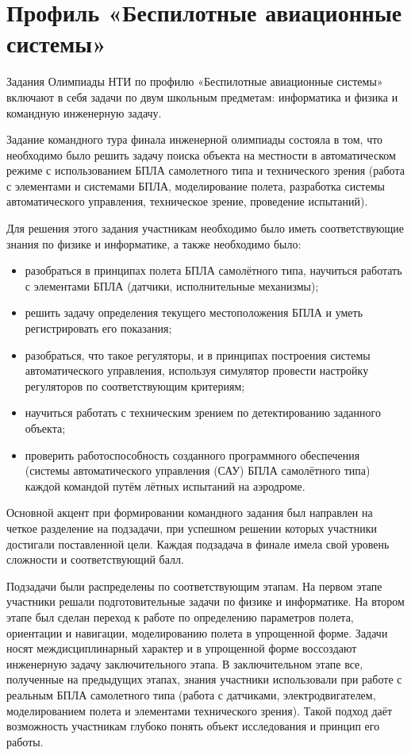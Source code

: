 

\chapter{Профиль «Беспилотные авиационные системы»}

Задания Олимпиады НТИ по профилю «Беспилотные авиационные системы» включают в себя задачи по двум школьным предметам: информатика и физика и командную инженерную задачу.

Задание командного тура финала инженерной олимпиады состояла в том, что необходимо было решить задачу поиска объекта на местности в автоматическом режиме с использованием БПЛА самолетного типа и технического зрения (работа с элементами и системами БПЛА, моделирование полета, разработка системы автоматического управления, техническое зрение, проведение испытаний).

Для решения этого задания участникам необходимо было иметь соответствующие знания по физике и информатике, а также необходимо было:
\begin{itemize}
    \item разобраться в принципах полета БПЛА самолётного типа, научиться работать с элементами БПЛА (датчики, исполнительные механизмы);
    \item решить задачу определения текущего местоположения БПЛА и уметь регистрировать его показания;
    \item разобраться, что такое регуляторы, и в принципах построения системы автоматического управления, используя симулятор провести настройку регуляторов по соответствующим критериям;
    \item научиться работать с техническим зрением по детектированию заданного объекта;
    \item проверить работоспособность созданного программного обеспечения (системы автоматического управления (САУ) БПЛА самолётного типа) каждой командой путём лётных испытаний на аэродроме.
\end{itemize}

Основной акцент при формировании командного задания был направлен на четкое разделение на подзадачи, при успешном решении которых участники достигали поставленной цели. Каждая подзадача в финале имела свой уровень сложности и соответствующий балл.

Подзадачи были распределены по соответствующим этапам. На первом этапе участники решали подготовительные задачи по физике и информатике. На втором этапе был сделан переход к работе по определению параметров полета, ориентации и навигации, моделированию полета в упрощенной форме. Задачи носят междисциплинарный характер и в упрощенной форме воссоздают инженерную задачу заключительного этапа. В заключительном этапе все, полученные на предыдущих этапах, знания участники использовали при работе с реальным БПЛА самолетного типа (работа с датчиками, электродвигателем, моделированием полета и элементами технического зрения). Такой подход даёт возможность участникам глубоко понять объект исследования и принцип его работы.